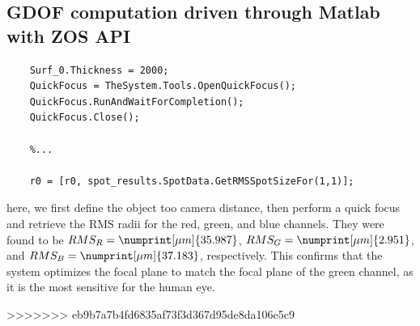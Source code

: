 \documentclass[10pt,letterpaper]{article}
\begin{document}
\subsection{GDOF computation driven through Matlab with ZOS API}
\begin{verbatim}
    Surf_0.Thickness = 2000;
    QuickFocus = TheSystem.Tools.OpenQuickFocus();
    QuickFocus.RunAndWaitForCompletion();
    QuickFocus.Close();

    %...

    r0 = [r0, spot_results.SpotData.GetRMSSpotSizeFor(1,1)];
\end{verbatim}

here, we first define the object too camera distance, then perform a quick focus and retrieve the RMS radii for the red, green, and blue channels. They were found to be $RMS_R = \numprint[\mu m]{35.987}$, $RMS_G = \numprint[\mu m]{2.951}$, and $RMS_B = \numprint[\mu m]{37.183}$, respectively. This confirms that the system optimizes the focal plane to match the focal plane of the green channel, as it is the most sensitive for the human eye.


>>>>>>> eb9b7a7b4fd6835af73f3d367d95de8da106e5c9
\end{document}
